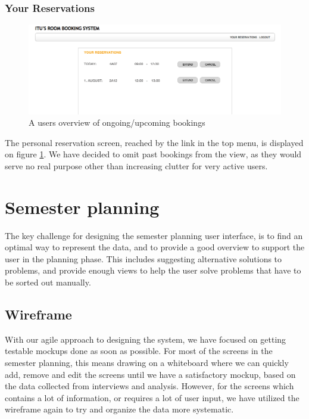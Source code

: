 \subsubsection*{Your Reservations}
\begin{figure}[htb]
\begin{center}
\leavevmode
\includegraphics[width=1\textwidth]{images/reservations}
\end{center}
\caption{A users overview of ongoing/upcoming bookings}
\label{fig:reservations}
\end{figure}
The personal reservation screen, reached by the link in the top menu, is displayed on figure \ref{fig:reservations}. We have decided to omit past bookings from the view, as they would serve no real purpose other than increasing clutter for very active users.

\section{Semester planning}
\label{sec:semester_planning_ui}
The key challenge for designing the semester planning user interface, is to find an optimal way to represent the data, and to provide a good overview to support the user in the planning phase. This includes suggesting alternative solutions to problems, and provide enough views to help the user solve problems that have to be sorted out manually.

\subsection{Wireframe}
\label{subsec:wire_sem}
With our agile approach to designing the system, we have focused on getting testable mockups done as soon as possible. For most of the screens in the semester planning, this means drawing on a whiteboard where we can quickly add, remove and edit the screens until we have a satisfactory mockup, based on the data collected from interviews and analysis. However, for the screens which contains a lot of information, or requires a lot of user input, we have utilized the wireframe again to try and organize the data more systematic.

